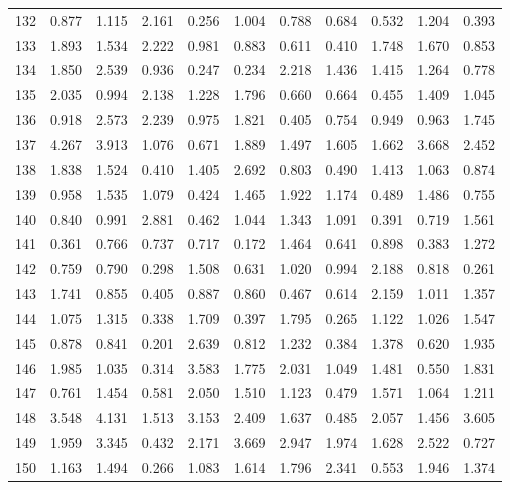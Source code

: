 \begin{tabular}{lrrrrrrrrrr}
132 &  0.877 &  1.115 &  2.161 &  0.256 &  1.004 &  0.788 &  0.684 &  0.532 &  1.204 &  0.393 \\
133 &  1.893 &  1.534 &  2.222 &  0.981 &  0.883 &  0.611 &  0.410 &  1.748 &  1.670 &  0.853 \\
134 &  1.850 &  2.539 &  0.936 &  0.247 &  0.234 &  2.218 &  1.436 &  1.415 &  1.264 &  0.778 \\
135 &  2.035 &  0.994 &  2.138 &  1.228 &  1.796 &  0.660 &  0.664 &  0.455 &  1.409 &  1.045 \\
136 &  0.918 &  2.573 &  2.239 &  0.975 &  1.821 &  0.405 &  0.754 &  0.949 &  0.963 &  1.745 \\
137 &  4.267 &  3.913 &  1.076 &  0.671 &  1.889 &  1.497 &  1.605 &  1.662 &  3.668 &  2.452 \\
138 &  1.838 &  1.524 &  0.410 &  1.405 &  2.692 &  0.803 &  0.490 &  1.413 &  1.063 &  0.874 \\
139 &  0.958 &  1.535 &  1.079 &  0.424 &  1.465 &  1.922 &  1.174 &  0.489 &  1.486 &  0.755 \\
140 &  0.840 &  0.991 &  2.881 &  0.462 &  1.044 &  1.343 &  1.091 &  0.391 &  0.719 &  1.561 \\
141 &  0.361 &  0.766 &  0.737 &  0.717 &  0.172 &  1.464 &  0.641 &  0.898 &  0.383 &  1.272 \\
142 &  0.759 &  0.790 &  0.298 &  1.508 &  0.631 &  1.020 &  0.994 &  2.188 &  0.818 &  0.261 \\
143 &  1.741 &  0.855 &  0.405 &  0.887 &  0.860 &  0.467 &  0.614 &  2.159 &  1.011 &  1.357 \\
144 &  1.075 &  1.315 &  0.338 &  1.709 &  0.397 &  1.795 &  0.265 &  1.122 &  1.026 &  1.547 \\
145 &  0.878 &  0.841 &  0.201 &  2.639 &  0.812 &  1.232 &  0.384 &  1.378 &  0.620 &  1.935 \\
146 &  1.985 &  1.035 &  0.314 &  3.583 &  1.775 &  2.031 &  1.049 &  1.481 &  0.550 &  1.831 \\
147 &  0.761 &  1.454 &  0.581 &  2.050 &  1.510 &  1.123 &  0.479 &  1.571 &  1.064 &  1.211 \\
148 &  3.548 &  4.131 &  1.513 &  3.153 &  2.409 &  1.637 &  0.485 &  2.057 &  1.456 &  3.605 \\
149 &  1.959 &  3.345 &  0.432 &  2.171 &  3.669 &  2.947 &  1.974 &  1.628 &  2.522 &  0.727 \\
150 &  1.163 &  1.494 &  0.266 &  1.083 &  1.614 &  1.796 &  2.341 &  0.553 &  1.946 &  1.374 \\

\end{tabular}
